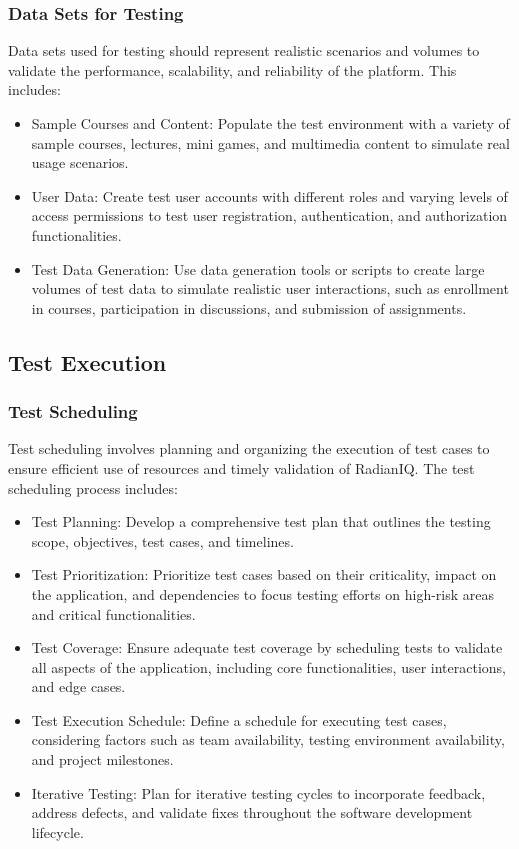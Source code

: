 		\subsubsection{Data Sets for Testing}
		
		Data sets used for testing should represent realistic scenarios and volumes to validate the performance, scalability, and reliability of the platform. This includes:
		
		\begin{itemize}
			\item Sample Courses and Content: Populate the test environment with a variety of sample courses, lectures, mini games, and multimedia content to simulate real usage scenarios.
			\item User Data: Create test user accounts with different roles and varying levels of access permissions to test user registration, authentication, and authorization functionalities.
			\item Test Data Generation: Use data generation tools or scripts to create large volumes of test data to simulate realistic user interactions, such as enrollment in courses, participation in discussions, and submission of assignments.
		\end{itemize}
		
		
	\subsection{Test Execution}
	
		\subsubsection{Test Scheduling}
		
		Test scheduling involves planning and organizing the execution of test cases to ensure efficient use of resources and timely validation of RadianIQ. The test scheduling process includes:
		
		\begin{itemize}
			\item Test Planning: Develop a comprehensive test plan that outlines the testing scope, objectives, test cases, and timelines.
			\item Test Prioritization: Prioritize test cases based on their criticality, impact on the application, and dependencies to focus testing efforts on high-risk areas and critical functionalities.
			\item Test Coverage: Ensure adequate test coverage by scheduling tests to validate all aspects of the application, including core functionalities, user interactions, and edge cases.
			\item Test Execution Schedule: Define a schedule for executing test cases, considering factors such as team availability, testing environment availability, and project milestones.
			\item Iterative Testing: Plan for iterative testing cycles to incorporate feedback, address defects, and validate fixes throughout the software development lifecycle.
		\end{itemize}
		
